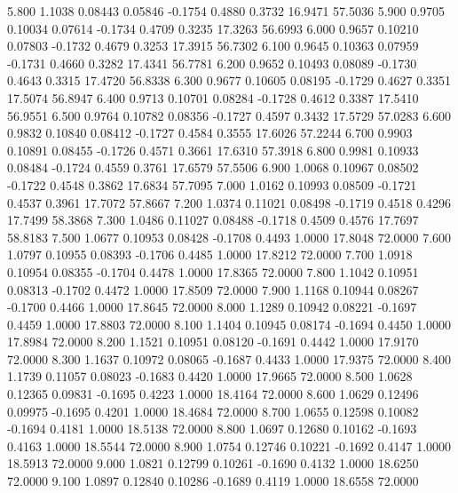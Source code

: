    5.800   1.1038   0.08443   0.05846  -0.1754   0.4880   0.3732  16.9471  57.5036
   5.900   0.9705   0.10034   0.07614  -0.1734   0.4709   0.3235  17.3263  56.6993
   6.000   0.9657   0.10210   0.07803  -0.1732   0.4679   0.3253  17.3915  56.7302
   6.100   0.9645   0.10363   0.07959  -0.1731   0.4660   0.3282  17.4341  56.7781
   6.200   0.9652   0.10493   0.08089  -0.1730   0.4643   0.3315  17.4720  56.8338
   6.300   0.9677   0.10605   0.08195  -0.1729   0.4627   0.3351  17.5074  56.8947
   6.400   0.9713   0.10701   0.08284  -0.1728   0.4612   0.3387  17.5410  56.9551
   6.500   0.9764   0.10782   0.08356  -0.1727   0.4597   0.3432  17.5729  57.0283
   6.600   0.9832   0.10840   0.08412  -0.1727   0.4584   0.3555  17.6026  57.2244
   6.700   0.9903   0.10891   0.08455  -0.1726   0.4571   0.3661  17.6310  57.3918
   6.800   0.9981   0.10933   0.08484  -0.1724   0.4559   0.3761  17.6579  57.5506
   6.900   1.0068   0.10967   0.08502  -0.1722   0.4548   0.3862  17.6834  57.7095
   7.000   1.0162   0.10993   0.08509  -0.1721   0.4537   0.3961  17.7072  57.8667
   7.200   1.0374   0.11021   0.08498  -0.1719   0.4518   0.4296  17.7499  58.3868
   7.300   1.0486   0.11027   0.08488  -0.1718   0.4509   0.4576  17.7697  58.8183
   7.500   1.0677   0.10953   0.08428  -0.1708   0.4493   1.0000  17.8048  72.0000
   7.600   1.0797   0.10955   0.08393  -0.1706   0.4485   1.0000  17.8212  72.0000
   7.700   1.0918   0.10954   0.08355  -0.1704   0.4478   1.0000  17.8365  72.0000
   7.800   1.1042   0.10951   0.08313  -0.1702   0.4472   1.0000  17.8509  72.0000
   7.900   1.1168   0.10944   0.08267  -0.1700   0.4466   1.0000  17.8645  72.0000
   8.000   1.1289   0.10942   0.08221  -0.1697   0.4459   1.0000  17.8803  72.0000
   8.100   1.1404   0.10945   0.08174  -0.1694   0.4450   1.0000  17.8984  72.0000
   8.200   1.1521   0.10951   0.08120  -0.1691   0.4442   1.0000  17.9170  72.0000
   8.300   1.1637   0.10972   0.08065  -0.1687   0.4433   1.0000  17.9375  72.0000
   8.400   1.1739   0.11057   0.08023  -0.1683   0.4420   1.0000  17.9665  72.0000
   8.500   1.0628   0.12365   0.09831  -0.1695   0.4223   1.0000  18.4164  72.0000
   8.600   1.0629   0.12496   0.09975  -0.1695   0.4201   1.0000  18.4684  72.0000
   8.700   1.0655   0.12598   0.10082  -0.1694   0.4181   1.0000  18.5138  72.0000
   8.800   1.0697   0.12680   0.10162  -0.1693   0.4163   1.0000  18.5544  72.0000
   8.900   1.0754   0.12746   0.10221  -0.1692   0.4147   1.0000  18.5913  72.0000
   9.000   1.0821   0.12799   0.10261  -0.1690   0.4132   1.0000  18.6250  72.0000
   9.100   1.0897   0.12840   0.10286  -0.1689   0.4119   1.0000  18.6558  72.0000
